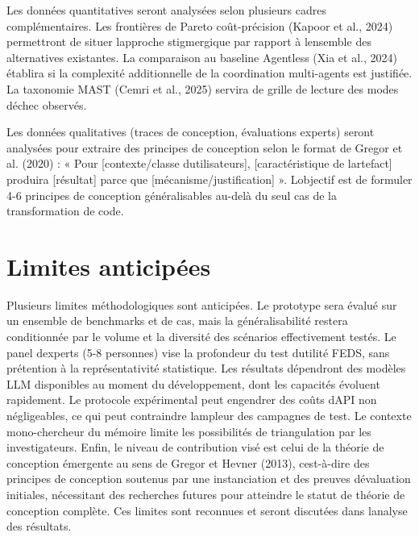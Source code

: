 Les données quantitatives seront analysées selon plusieurs cadres
complémentaires. Les frontières de Pareto coût-précision (Kapoor et al.,
2024) permettront de situer l\textquotesingle approche stigmergique par
rapport à l\textquotesingle ensemble des alternatives existantes. La
comparaison au baseline Agentless (Xia et al., 2024) établira si la
complexité additionnelle de la coordination multi-agents est justifiée.
La taxonomie MAST (Cemri et al., 2025) servira de grille de lecture
des modes d\textquotesingle échec observés.

Les données qualitatives (traces de conception, évaluations experts)
seront analysées pour extraire des principes de conception selon le
format de Gregor et al. (2020) : « Pour [contexte/classe
d\textquotesingle utilisateurs], [caractéristique de
l\textquotesingle artefact] produira [résultat] parce que
[mécanisme/justification] ». L\textquotesingle objectif est de formuler
4-6 principes de conception généralisables au-delà du seul cas de la
transformation de code.

\section{Limites anticipées}\label{limites-anticipuxe9es}

Plusieurs limites méthodologiques sont anticipées. Le prototype sera
évalué sur un ensemble de benchmarks et de cas, mais la
généralisabilité restera conditionnée par le volume et la diversité des
scénarios effectivement testés. Le panel d\textquotesingle experts
(5-8 personnes) vise la profondeur du test d\textquotesingle utilité
FEDS, sans prétention à la représentativité statistique. Les résultats dépendront des modèles LLM
disponibles au moment du développement, dont les capacités évoluent
rapidement. Le protocole expérimental peut engendrer des coûts
d\textquotesingle API non négligeables, ce qui peut contraindre
l\textquotesingle ampleur des campagnes de test. Le contexte
mono-chercheur du mémoire limite les possibilités de triangulation par
les investigateurs. Enfin, le niveau de contribution visé est celui de
la théorie de conception émergente au sens de Gregor et Hevner (2013), c\textquotesingle est-à-dire
des principes de conception soutenus par une instanciation et des
preuves d\textquotesingle évaluation initiales, nécessitant des
recherches futures pour atteindre le statut de théorie de conception
complète. Ces limites sont reconnues et seront discutées dans
l\textquotesingle analyse des résultats.

